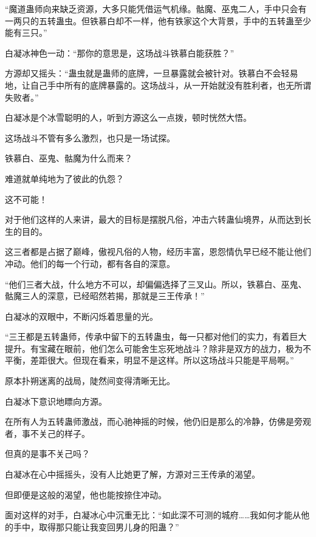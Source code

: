 \begin{this_body}
“魔道蛊师向来缺乏资源，大多只能凭借运气机缘。骷魔、巫鬼二人，手中只会有一两只的五转蛊虫。但铁慕白却不一样，他有铁家这个大背景，手中的五转蛊至少能有三只。”

白凝冰神色一动：“那你的意思是，这场战斗铁慕白能获胜？”

方源却又摇头：“蛊虫就是蛊师的底牌，一旦暴露就会被针对。铁慕白不会轻易地，让自己手中所有的底牌暴露的。这场战斗，从一开始就没有胜利者，也无所谓失败者。”

白凝冰是个冰雪聪明的人，听到方源这么一点拨，顿时恍然大悟。

这场战斗不管有多么激烈，也只是一场试探。

铁慕白、巫鬼、骷魔为什么而来？

难道就单纯地为了彼此的仇怨？

这不可能！

对于他们这样的人来讲，最大的目标是摆脱凡俗，冲击六转蛊仙境界，从而达到长生的目的。

这三者都是占据了巅峰，傲视凡俗的人物，经历丰富，恩怨情仇早已经不能让他们冲动。他们的每一个行动，都有各自的深意。

“他们三者大战，什么地方不可以，却偏偏选择了三叉山。所以，铁慕白、巫鬼、骷魔三人的深意，已经昭然若揭，那就是三王传承！”

白凝冰的双眼中，不断闪烁着思量的光。

“三王都是五转蛊师，传承中留下的五转蛊虫，每一只都对他们的实力，有着巨大提升。有宝藏在眼前，他们怎么可能舍生忘死地战斗？除非是双方的战力，极为不平衡，差距很大。但现在看来，明显不是这样。所以这场战斗只能是平局啊。”

原本扑朔迷离的战局，陡然间变得清晰无比。

白凝冰下意识地瞟向方源。

在所有人为五转蛊师激战，而心驰神摇的时候，他仍旧是那么的冷静，仿佛是旁观者，事不关己的样子。

但真的是事不关己吗？

白凝冰在心中摇摇头，没有人比她更了解，方源对三王传承的渴望。

但即便是这般的渴望，他也能按捺住冲动。

面对这样的对手，白凝冰心中沉重无比：“如此深不可测的城府……我如何才能从他的手中，取得那只能让我变回男儿身的阳蛊？”

\end{this_body}

